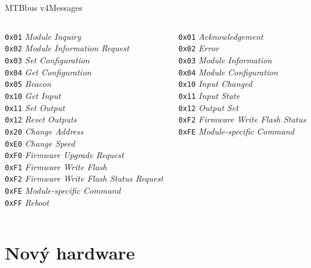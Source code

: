 \documentclass[aspectratio=169]{beamer}
\begin{document}
\begin{frame}{MTBbus v4}{Messages}
\footnotesize
\begin{columns}
	\begin{column}{.45\textwidth}
		\texttt{0x01} \textit{Module Inquiry} \\
		\texttt{0x02} \textit{Module Information Request} \\
		\texttt{0x03} \textit{Set Configuration} \\
		\texttt{0x04} \textit{Get Configuration} \\
		\texttt{0x05} \textit{Beacon} \\
		\texttt{0x10} \textit{Get Input} \\
		\texttt{0x11} \textit{Set Output} \\
		\texttt{0x12} \textit{Reset Outputs} \\
		\texttt{0x20} \textit{Change Address} \\
		\texttt{0xE0} \textit{Change Speed} \\
		\texttt{0xF0} \textit{Firmware Upgrade Request} \\
		\texttt{0xF1} \textit{Firmware Write Flash} \\
		\texttt{0xF2} \textit{Firmware Write Flash Status Request} \\
		\texttt{0xFE} \textit{Module-specific Command} \\
		\texttt{0xFF} \textit{Reboot}
	\end{column}
	\begin{column}{.45\textwidth}
		\texttt{0x01} \textit{Acknowledgement} \\
		\texttt{0x02} \textit{Error} \\
		\texttt{0x03} \textit{Module Information} \\
		\texttt{0x04} \textit{Module Configuration} \\
		\texttt{0x10} \textit{Input Changed} \\
		\texttt{0x11} \textit{Input State} \\
		\texttt{0x12} \textit{Output Set} \\
		\texttt{0xF2} \textit{Firmware Write Flash Status} \\
		\texttt{0xFE} \textit{Module-specific Command}
	\end{column}
\end{columns}
\end{frame}


\section{Nový hardware}
\end{document}
